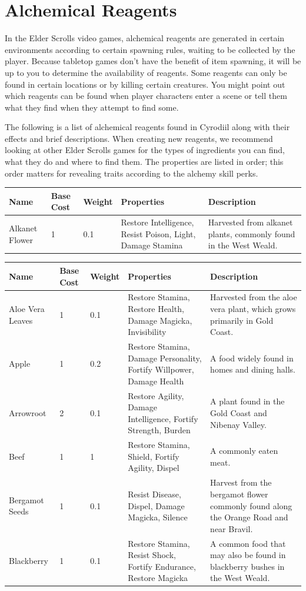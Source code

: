 \documentclass[12pt]{book}
\begin{document}
\chapter{Alchemical Reagents}
In the Elder Scrolls video games, alchemical reagents are generated in certain environments according to certain spawning rules, waiting to be collected by the player. Because tabletop games don't have the benefit of item spawning, it will be up to you to determine the availability of reagents. Some reagents can only be found in certain locations or by killing certain creatures. You might point out which reagents can be found when player characters enter a scene or tell them what they find when they attempt to find some.

The following is a list of alchemical reagents found in Cyrodiil along with their effects and brief descriptions. When creating new reagents, we recommend looking at other Elder Scrolls games for the types of ingredients you can find, what they do and where to find them. The properties are listed in order; this order matters for revealing traits according to the alchemy skill perks.

\begin{tabular}{|p{}|p{}|p{}|p{}|p{}|}
\hline
Name & Base Cost & Weight & Properties & Description\\ \hline
Alkanet Flower & 1 & 0.1 & Restore Intelligence, Resist Poison, Light, Damage Stamina & Harvested from alkanet plants, commonly found in the West Weald.\\ \hline
\end{tabular}

\begin{tabular}{|p{}|p{}|p{}|p{}|p{}|}
\hline
Name & Base Cost & Weight & Properties & Description\\ \hline
Aloe Vera Leaves & 1 & 0.1 & Restore Stamina, Restore Health, Damage Magicka, Invisibility & Harvested from the aloe vera plant, which grows primarily in Gold Coast.\\ \hline
Apple & 1 & 0.2 & Restore Stamina, Damage Personality, Fortify Willpower, Damage Health & A food widely found in homes and dining halls.\\ \hline
Arrowroot & 2 & 0.1 & Restore Agility, Damage Intelligence, Fortify Strength, Burden & A plant found in the Gold Coast and Nibenay Valley.\\ \hline
Beef & 1 & 1 & Restore Stamina, Shield, Fortify Agility, Dispel & A commonly eaten meat.\\ \hline
Bergamot Seeds & 1 & 0.1 & Resist Disease, Dispel, Damage Magicka, Silence & Harvest from the bergamot flower commonly found along the Orange Road and near Bravil.\\ \hline
Blackberry & 1 & 0.1 & Restore Stamina, Resist Shock, Fortify Endurance, Restore Magicka & A common food that may also be found in blackberry bushes in the West Weald.\\ \hline
\end{tabular}
\end{document}
